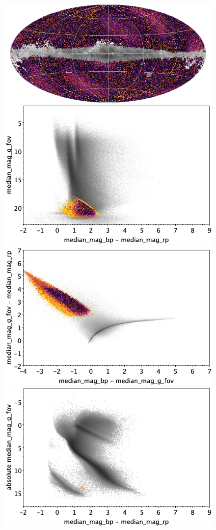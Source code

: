\documentclass[longauth]{aa}
\begin{document}
\begin{appendix}
\begin{figure}
\centering
{}
\includegraphics[width=0.6\hsize]{figures/appendix/GALAXY_ALL_cls_sky.png} 
 \\ %
\vspace{4mm}
 \includegraphics[width=0.45\hsize]{figures/appendix/GALAXY_ALL_cls_cm.png}  %
\hspace{2mm}
 \includegraphics[width=0.45\hsize]{figures/appendix/GALAXY_ALL_cls_cc.png} \\ %
\vspace{4mm}
 \includegraphics[width=0.45\hsize]{figures/appendix/GALAXY_ALL_cls_cam.png}  %

\end{figure}
\end{appendix}
\end{document}
